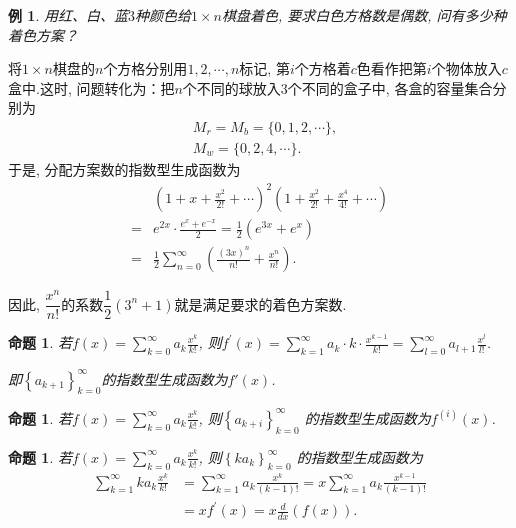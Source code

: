 \documentclass[punct]{ctexbeamer}
\newtheorem{prop}[thm]{命题}
\newtheorem{ex}{例}[section]
\def\sol{\noindent {\bf 解\ }}
\begin{document}
\begin{frame}
	\begin{ex}
		用红、白、蓝$3$种颜色给$1\times n$棋盘着色, 要求白色方格数是偶数, 问有多少种着色方案？
	\end{ex}
\pause\sol
将$1\times n$棋盘的$n$个方格分别用$1,2,\cdots,n$标记, 第$i$个方格着$c$色看作把第$i$个物体放入$c$盒中.这时, 问题转化为：把$n$个不同的球放入3个不同的盒子中, 各盒的容量集合分别为
\[
\begin{aligned}
&M_{r}=M_{b}=\{0,1,2, \cdots\}, \\
&M_{w}=\{0,2,4, \cdots\} .
\end{aligned}
\]于是, 分配方案数的指数型生成函数为\[
\begin{aligned}
&\left(1+x+\frac{x^{2}}{2 !}+\cdots\right)^{2}\left(1+\frac{x^{2}}{2 !}+\frac{x^{4}}{4 !}+\cdots\right) \\
=&e^{2 x} \cdot \frac{e^x+e^{-x}}{2}  =  \frac{1}{2} \left( e^{3 x} + e^x \right)\\
=& \frac{1}{2}\sum_{n=0}^{\infty}\left(\frac{(3x)^n}{n!}+\frac{x^n}{n!}\right).
\end{aligned}
\]

因此, $\dfrac{x^{n}}{n!}$的系数$ \dfrac{1}{2}(3^{n}+1) $就是满足要求的着色方案数.
\end{frame}

\begin{frame}
	\begin{prop}
		若$f(x)=\sum_{k=0}^{\infty} a_{k} \frac{x^{k}}{k !}$, 则$f^{\prime}(x)=\sum_{k=1}^{\infty} a_{k} \cdot k \cdot \frac{x^{k-1}}{k !}=\sum_{l=0}^{\infty} a_{l+1} \frac{x^{l}}{l !}$.

		即$\left\{a_{k+1}\right\}_{k=0}^{\infty}$的指数型生成函数为$f'(x)$.
	\end{prop}
\begin{prop}
	若$f(x)=\sum_{k=0}^{\infty} a_{k} \frac{x^{k}}{k !}$, 则$\left\{a_{k+i}\right\}_{k=0}^{\infty}$
	的指数型生成函数为$f^{ (i) }(x)$.
\end{prop}
\begin{prop}
	若$f(x)=\sum_{k=0}^{\infty} a_{k} \frac{x^{k}}{k !}$, 则$\left\{ka_{k}\right\}_{k=0}^{\infty}$
	的指数型生成函数为
	$$
	\begin{aligned}
	\sum_{k=1}^{\infty} k a_{k} \frac{x^{k}}{k !} &=\sum_{k=1}^{\infty} a_{k} \frac{x^{k}}{(k-1) !}=x \sum_{k=1}^{\infty} a_{k} \frac{x^{k-1}}{(k-1) !} \\
	&=x f^{\prime}(x)=x \frac{d}{d x}(f(x)).
	\end{aligned}
	$$
\end{prop}
\end{frame}
\end{document}
